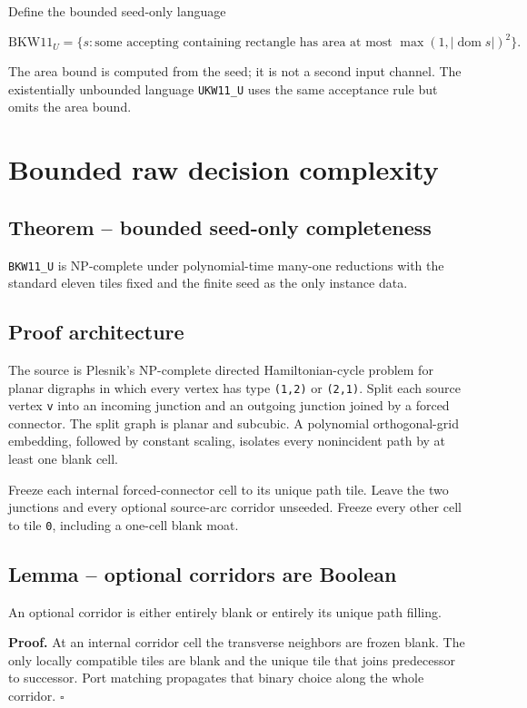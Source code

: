 \documentclass[11pt]{article}
\begin{document}
Define the bounded seed-only language

\[
 \mathrm{BKW11}_U=\{s:\text{some accepting containing rectangle has area at
 most }\max(1,|\operatorname{dom}s|)^2\}.
\]

The area bound is computed from the seed; it is not a second input channel.
The existentially unbounded language \texttt{UKW11\_U} uses the same acceptance rule
but omits the area bound.

\section{Bounded raw decision complexity}

\subsection{Theorem -- bounded seed-only completeness}

\texttt{BKW11\_U} is NP-complete under polynomial-time many-one reductions with the
standard eleven tiles fixed and the finite seed as the only instance data.

\subsection{Proof architecture}

The source is Plesnik's NP-complete directed Hamiltonian-cycle problem for
planar digraphs in which every vertex has type \texttt{(1,2)} or \texttt{(2,1)}.  Split each
source vertex \texttt{v} into an incoming junction and an outgoing junction joined by
a forced connector.  The split graph is planar and subcubic.  A polynomial
orthogonal-grid embedding, followed by constant scaling, isolates every
nonincident path by at least one blank cell.

Freeze each internal forced-connector cell to its unique path tile.  Leave the
two junctions and every optional source-arc corridor unseeded.  Freeze every
other cell to tile \texttt{0}, including a one-cell blank moat.

\subsection{Lemma -- optional corridors are Boolean}

An optional corridor is either entirely blank or entirely its unique path
filling.

\textbf{Proof.}  At an internal corridor cell the transverse neighbors are frozen
blank.  The only locally compatible tiles are blank and the unique tile that
joins predecessor to successor.  Port matching propagates that binary choice
along the whole corridor. \hfill$\square$
\end{document}
